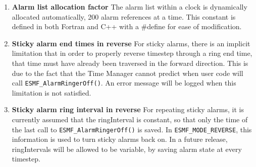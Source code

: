 
\begin{enumerate}

\item {\bf Alarm list allocation factor}  The alarm list within a clock is
dynamically allocated automatically, 200 alarm references at a time.
This constant is defined in both Fortran and C++ with a \#define for ease
of modification.

\item {\bf Sticky alarm end times in reverse}  For sticky alarms, there is
an implicit limitation that in order to properly reverse timestep through a
ring end time, that time must have already been traversed in the forward
direction.  This is due to the fact that the Time Manager cannot predict
when user code will call {\tt ESMF\_AlarmRingerOff()}.  An error message
will be logged when this limitation is not satisfied.

\item {\bf Sticky alarm ring interval in reverse}  For repeating sticky alarms,
it is currently assumed that the ringInterval is constant, so that only the
time of the last call to {\tt ESMF\_AlarmRingerOff()} is saved.  In
{\tt ESMF\_MODE\_REVERSE}, this information is used to turn sticky alarms
back on.  In a future release, ringIntervals will be allowed to be variable,
by saving alarm state at every timestep.

\end{enumerate}
